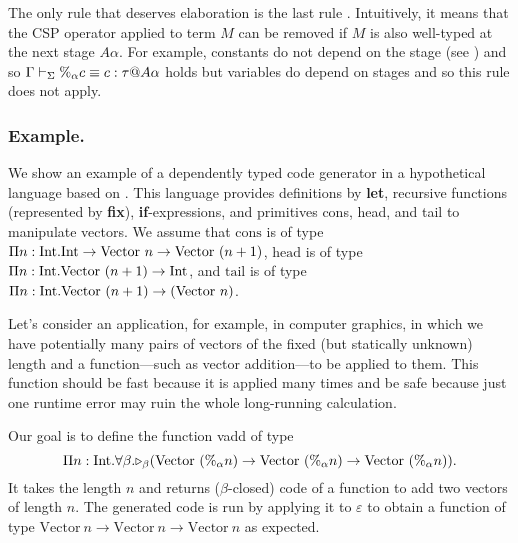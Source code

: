 The only rule that deserves elaboration is the last rule \QPercent.
Intuitively, it means that the CSP operator applied to term $M$ can be
removed if $M$ is also well-typed at the next stage \(A\alpha\).
For example, constants do not depend on the stage (see \TConst) and
so \(\Gamma\vdash_\Sigma \%_\alpha c \equiv c : \tau @ A\alpha\) holds but variables
do depend on stages and so this rule does not apply.

\subsubsection{Example.}

We show an example of a dependently typed code generator in a
hypothetical language based on \LTP.  
This language provides definitions by \textbf{let},
recursive functions (represented by \textbf{fix}), \textbf{if}-expressions,
and primitives cons, head, and tail to manipulate vectors. We assume that
$\text{cons}$ is of type $\Pi n:\textrm{Int}.\textrm{Int} \to \text{Vector}\ n \to \text{Vector}\ (n+1)$, 
$\text{head}$ is of type $\Pi n:\textrm{Int}.\text{Vector}\ (n+1) \to \textrm{Int}$, and
$\text{tail}$ is of type $\Pi n:\textrm{Int}.\text{Vector}\ (n+1) \to (\text{Vector}\ n)$.

Let's consider an application, for example, in computer graphics, in which we
have potentially many pairs of vectors of the fixed (but statically unknown)
length and a function---such as vector addition---to be applied to
them. This function should be fast because it is applied many times and be
safe because just one runtime error may ruin the whole long-running calculation.


\newcommand{\Vpn}{\text{Vector}\ (\%_\alpha n)}

Our goal is to define the function vadd of type
\[
  \Pi n:\I.\F\beta.\TW_\beta(\Vpn\to\Vpn\to\Vpn).
\]
\renewcommand{\Vpn}{\text{Vector}\ n}
It takes the length $n$ and returns ($\beta$-closed) code of a
function to add two vectors of length $n$.  The generated
code is run by applying it to \(\varepsilon\) to obtain
a function of type \(\Vpn\to\Vpn\to\Vpn\) as expected.

